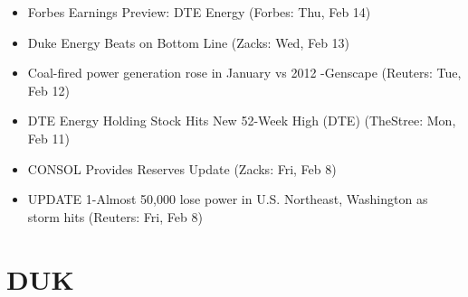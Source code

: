 \documentclass[11pt,asymmetric]{article}
\begin{document}
\begin{itemize}
\item Forbes Earnings Preview: DTE Energy (Forbes: Thu, Feb 14)
\item Duke Energy Beats on Bottom Line (Zacks: Wed, Feb 13)
\item Coal-fired power generation rose in January vs 2012 -Genscape (Reuters: Tue, Feb 12)
\item DTE Energy Holding Stock Hits New 52-Week High (DTE) (TheStree: Mon, Feb 11)
\item CONSOL Provides Reserves Update (Zacks: Fri, Feb 8)
\item UPDATE 1-Almost 50,000 lose power in U.S. Northeast, Washington as storm hits (Reuters: Fri, Feb 8)
\end{itemize}

\section*{DUK}
\end{document}
